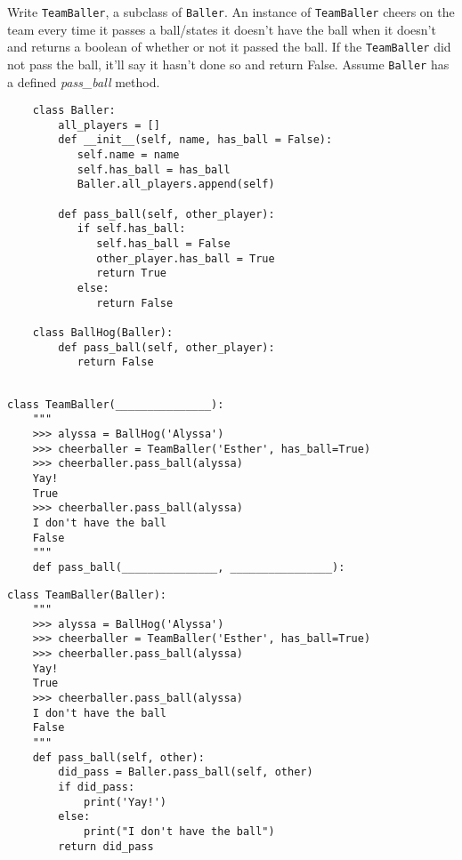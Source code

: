 \begin{blocksection}
\question Write \lstinline$TeamBaller$, a subclass of \lstinline$Baller$. An instance of \lstinline$TeamBaller$ cheers on the team every time it passes a ball/states it doesn't have the ball when it doesn't and returns a boolean of whether or not it passed the ball. If the \lstinline$TeamBaller$ did not pass the ball, it'll say it hasn't done so and return False. Assume \lstinline$Baller$ has a defined \textit{pass\_ball} method.

\begin{lstlisting}
    class Baller:
        all_players = []
        def __init__(self, name, has_ball = False):
           self.name = name
           self.has_ball = has_ball
           Baller.all_players.append(self)
    
        def pass_ball(self, other_player):
           if self.has_ball:
              self.has_ball = False
              other_player.has_ball = True
              return True
           else:
              return False
    
    class BallHog(Baller):
        def pass_ball(self, other_player):
           return False
    
\end{lstlisting}

\ifprintanswers\else
\begin{lstlisting}
class TeamBaller(_______________):
    """
    >>> alyssa = BallHog('Alyssa')
    >>> cheerballer = TeamBaller('Esther', has_ball=True)
    >>> cheerballer.pass_ball(alyssa)
    Yay! 
    True 
    >>> cheerballer.pass_ball(alyssa)
    I don't have the ball 
    False 
    """
    def pass_ball(_______________, ________________):
\end{lstlisting}
\fi

\begin{solution}[1in]
\begin{lstlisting}
class TeamBaller(Baller):
    """
    >>> alyssa = BallHog('Alyssa')
    >>> cheerballer = TeamBaller('Esther', has_ball=True)
    >>> cheerballer.pass_ball(alyssa)
    Yay!
    True
    >>> cheerballer.pass_ball(alyssa)
    I don't have the ball
    False
    """
    def pass_ball(self, other):
        did_pass = Baller.pass_ball(self, other)
        if did_pass:
            print('Yay!')
        else:
            print("I don't have the ball")
        return did_pass
\end{lstlisting}
\end{solution}


\end{blocksection}
